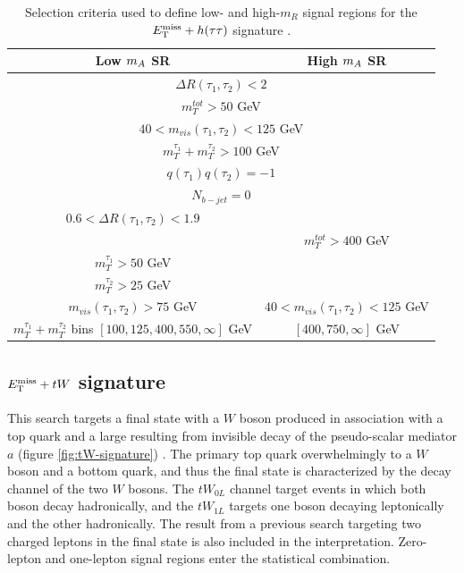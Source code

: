 \begin{table}[h!]
    \centering
    \begin{tabular}{|c|c|}
    \hline
     \textbf{Low $m_A$ SR}    &  \textbf{High $m_A$ SR} \\
     \hline
      \multicolumn{2}{|c|}{$\Delta R(\tau_1, \tau_2) < 2$}  \\ \hline
      \multicolumn{2}{|c|}{$m_T^{tot} > 50$ GeV }    \\ \hline
       \multicolumn{2}{|c|}{$40 < m_{vis}(\tau_1, \tau_2) < 125 $  GeV}  \\ \hline
        \multicolumn{2}{|c|}{$m_T^{\tau_1} + m_T^{\tau_2} > 100$ GeV} \\ \hline
        \multicolumn{2}{|c|}{$q(\tau_1)q(\tau_2)=-1$} \\  \hline
        \multicolumn{2}{|c|}{$N_{b-jet} = 0$} \\  \hline
        $0.6<\Delta R(\tau_1,\tau_2) < 1.9$  &   \\ \hline
        & $m_T^{tot}>400$ GeV \\ \hline
        $m_T^{\tau_1}>50$ GeV & \\ \hline
        $m_T^{\tau_2}>25$ GeV & \\ \hline
        $m_{vis}(\tau_1, \tau_2)>75$ GeV & $40<m_{vis}(\tau_1, \tau_2)<125$ GeV \\ 
    \hline
        $m_T^{\tau_1} + m_T^{\tau_2}$ bins $[100,125,400,550,\infty]$ GeV & $[400, 750, \infty]$ GeV \\ \hline
    \hline
    \end{tabular}
    \caption{Selection criteria used to define low- and high-$m_R$ signal regions for the $E_{\mathrm{T}}^{\mathrm{miss}}+h(\tau\tau)$ signature \cite{HDBS-2018-50}.}
    \label{tab:htautau-selection}
\end{table}

\subsection{\texorpdfstring{$E_{\mathrm{T}}^{\mathrm{miss}}+tW$}{TEXT} signature}
\label{subsect:metjw}
This search targets a final state with a $W$ boson produced in association with a top quark and a large \met resulting from invisible decay of the pseudo-scalar mediator $a$ (figure \ref{fig:tW-signature}) \cite{EXOT-2021-01}. The primary top quark overwhelmingly to a $W$ boson and a bottom quark, and thus the final state is characterized by the decay channel of the two $W$ bosons. The $tW_{0L}$ channel target events in which both boson decay hadronically, and the $tW_{1L}$ targets one boson decaying leptonically and the other hadronically. The result from a previous search targeting two charged leptons \cite{EXOT-2018-43} in the final state is also included in the interpretation. Zero-lepton and one-lepton signal regions enter the statistical combination. 

